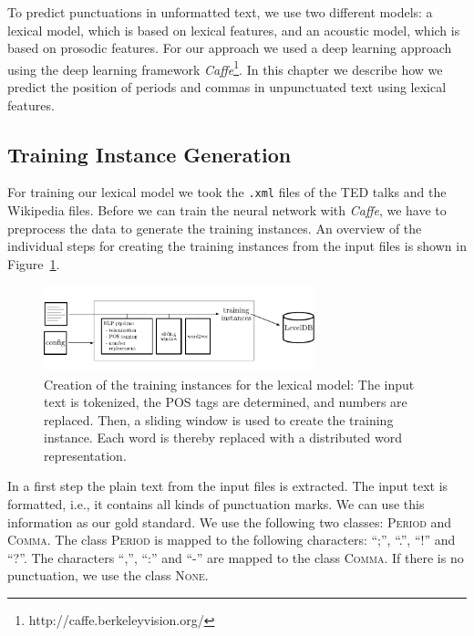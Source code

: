 To predict punctuations in unformatted text, we use two different models: a lexical model, which is based on lexical features, and an acoustic model, which is based on prosodic features.
For our approach we used a deep learning approach using the deep learning framework \emph{Caffe}\footnote{http://caffe.berkeleyvision.org/}.
In this chapter we describe how we predict the position of periods and commas in unpunctuated text using lexical features.

\subsection{Training Instance Generation}
For training our lexical model we took the \texttt{.xml} files of the TED talks and the Wikipedia files.
Before we can train the neural network with \emph{Caffe}, we have to preprocess the data to generate the training instances.
An overview of the individual steps for creating the training instances from the input files is shown in Figure~\ref{fig:overview_lexical}.

\begin{figure}[ht]
    \centering
    \includegraphics[width=0.7\textwidth]{img/overview_lexical.pdf}
    \caption{Creation of the training instances for the lexical model: The input text is tokenized, the POS tags are determined, and numbers are replaced. Then, a sliding window is used to create the training instance. Each word is thereby replaced with a distributed word representation.}
    \label{fig:overview_lexical}
\end{figure}

In a first step the plain text from the input files is extracted.
The input text is formatted, i.e., it contains all kinds of punctuation marks.
We can use this information as our gold standard.
We use the following two classes: \textsc{Period} and \textsc{Comma}.
The class \textsc{Period} is mapped to the following characters: ``;'', ``.'', ``!'' and ``?''.
The characters ``,'', ``:'' and ``-'' are mapped to the class \textsc{Comma}.
If there is no punctuation, we use the class \textsc{None}.

